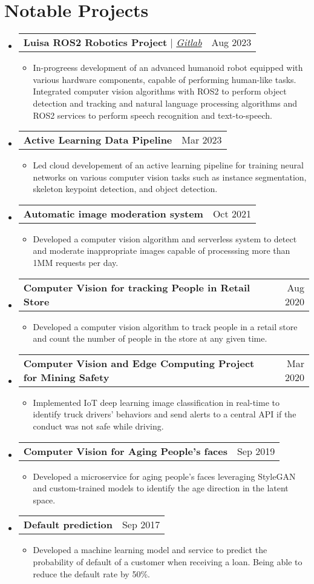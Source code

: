 \documentclass[letterpaper,11pt]{article}
\makeatletter
\newcommand{\resumeItem}[1]{
  \item\small{
    {#1 \vspace{-2pt}}
  }
}
\newcommand{\resumeProjectHeading}[2]{
  \vspace{-2pt}\item
  \begin{tabular*}{0.97\textwidth}{l@{\extracolsep{\fill}}r}
    \small#1 & #2 \\
  \end{tabular*}\vspace{-7pt}
}
\newcommand{\resumeSubHeadingListStart}{\begin{itemize}[leftmargin=0.15in, label={}]}
\newcommand{\resumeSubHeadingListEnd}{\end{itemize}}
\newcommand{\resumeItemListStart}{\begin{itemize}}
\newcommand{\resumeItemListEnd}{\end{itemize}\vspace{-5pt}}
\makeatother
\begin{document}
\section*{Notable Projects}
    \vspace{3pt}
    \resumeSubHeadingListStart
        \resumeProjectHeading
            {\textbf{Luisa ROS2 Robotics Project} $|$ \emph{\href{https://gitlab.com/gaitan.ignacio/luisa-robot}{\color{blue}Gitlab}}}{Aug 2023}
            \resumeItemListStart
                \resumeItem{In-progreess development of an advanced humanoid robot equipped with various hardware components, capable of performing human-like tasks.
                Integrated computer vision algorithms with ROS2 to perform object detection and tracking and natural language processing algorithms and ROS2 services to perform speech recognition and text-to-speech.}
            \resumeItemListEnd
        \resumeProjectHeading
            {\textbf{Active Learning Data Pipeline}}{Mar 2023}
            \resumeItemListStart
                \resumeItem{Led cloud developement of an active learning pipeline for training neural networks on various computer vision tasks such as instance segmentation, skeleton keypoint detection, and object detection.}
            \resumeItemListEnd
        \resumeProjectHeading
            {\textbf{Automatic image moderation system}}{Oct 2021}
            \resumeItemListStart
                \resumeItem{Developed a computer vision algorithm and serverless system to detect and moderate inappropriate images capable of processsing more than 1MM requests per day.}
            \resumeItemListEnd
        \resumeProjectHeading
            {\textbf{Computer Vision for tracking People in Retail Store}}{Aug 2020}
            \resumeItemListStart
                \resumeItem{Developed a computer vision algorithm to track people in a retail store and count the number of people in the store at any given time.}
            \resumeItemListEnd
        \resumeProjectHeading
            {\textbf{Computer Vision and Edge Computing Project for Mining Safety}}{Mar 2020}
            \resumeItemListStart
                \resumeItem{Implemented IoT deep learning image classification in real-time to identify truck drivers' behaviors and send alerts to a central API if the conduct was not safe while driving.}
            \resumeItemListEnd
        \resumeProjectHeading
            {\textbf{Computer Vision for Aging People’s faces}}{Sep 2019}
            \resumeItemListStart
            \resumeItem{Developed a microservice for aging people's faces leveraging StyleGAN and custom-trained models to identify the age direction in the latent space.}
            \resumeItemListEnd
        \resumeProjectHeading
            {\textbf{Default prediction}}{Sep 2017}
            \resumeItemListStart
                \resumeItem{Developed a machine learning model and service to predict the probability of default of a customer when receiving a loan. Being able to reduce the default rate by 50\%.}
            \resumeItemListEnd
    \resumeSubHeadingListEnd
\end{document}
